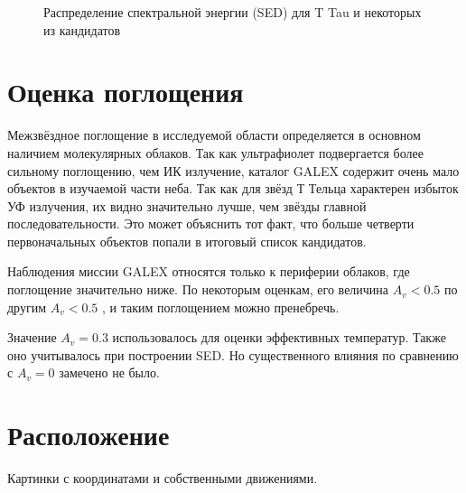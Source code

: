 \begin{figure}[ht]
\begin{minipage}[ht]{0.49\linewidth}
\end{minipage}
\hfill
\begin{minipage}[ht]{0.49\linewidth}
\end{minipage}
\begin{minipage}[ht]{0.49\linewidth}
\end{minipage}
\hfill
\begin{minipage}[ht]{0.49\linewidth}
\end{minipage}
\caption{Распределение спектральной энергии (SED) для T Tau и некоторых из кандидатов}
\label{fig:sed}
\end{figure}

\section{Оценка поглощения}

Межзвёздное поглощение в исследуемой области определяется в основном наличием молекулярных облаков.
Так как ультрафиолет подвергается более сильному поглощению, чем ИК излучение, каталог GALEX содержит очень мало объектов в изучаемой части неба. Так как для звёзд Т Тельца характерен избыток УФ излучения, их видно значительно лучше, чем звёзды главной последовательности. Это может объяснить тот факт, что больше четверти первоначальных объектов попали в итоговый список кандидатов.

Наблюдения миссии GALEX относятся только к периферии облаков, где поглощение значительно ниже. По некоторым оценкам, его величина $A_v < 0.5$ \cite{AIGdC2014galex} по другим $A_v < 0.5$ \cite{park2012far}, и таким поглощением можно пренебречь.

Значение $A_v = 0.3$ использовалось для оценки эффективных температур. Также оно учитывалось при построении SED. Но существенного влияния по сравнению с $A_v = 0$ замечено не было.

\section{Расположение}
Картинки с координатами и собственными движениями.


